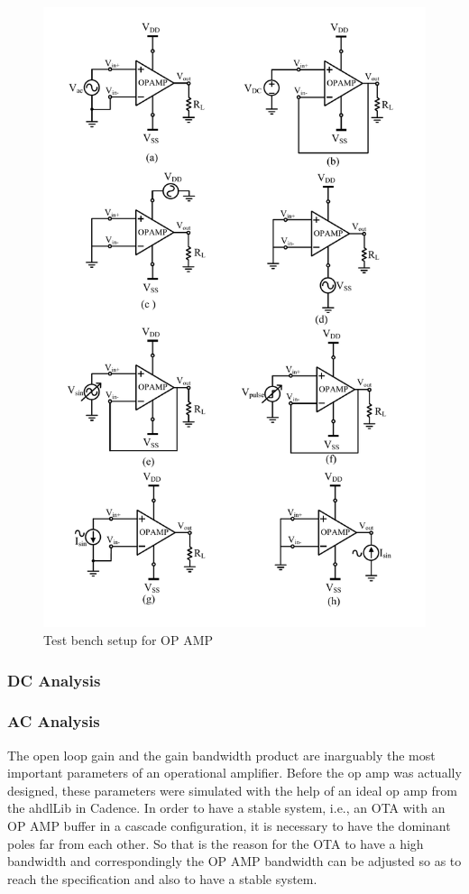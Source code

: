 \begin{figure} [H]
\centering
\includegraphics[scale=0.8]{Figures/Test_Benches/OPAMP_TB.pdf}
\caption{Test bench setup for OP AMP}
\label{fig:OPAMP_TB}
\end{figure}

\subsubsection{DC Analysis}


\subsubsection{AC Analysis}
The open loop gain and the gain bandwidth product are inarguably the most important parameters of an operational amplifier. Before the op amp was actually designed, these parameters were simulated with the help of an ideal op amp from the ahdlLib in Cadence. In order to have a stable system, i.e., an OTA with an OP AMP buffer in a cascade configuration, it is necessary to have the dominant poles far from each other. So that is the reason for the OTA to have a high bandwidth and correspondingly the OP AMP bandwidth can be adjusted so as to reach the specification and also to have a stable system.

